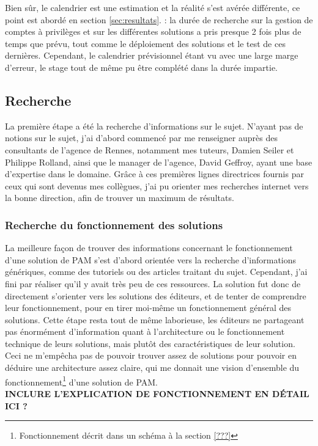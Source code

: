 Bien sûr, le calendrier est une estimation et la réalité s'est avérée différente, ce point est abordé en section \ref{sec:resultats}. : la durée de recherche sur la gestion de comptes à privilèges et sur les différentes solutions a pris presque 2 fois plus de temps que prévu, tout comme le déploiement des solutions et le test de ces dernières. Cependant, le calendrier prévisionnel étant vu avec une large marge d'erreur, le stage tout de même pu être complété dans la durée impartie.

\subsection{Recherche}
\label{subsec:recherche}

La première étape a été la recherche d'informations sur le sujet. N'ayant pas de notions sur le sujet, j'ai d'abord commencé par me renseigner auprès des consultants de l'agence de Rennes, notamment mes tuteurs, Damien Seiler et Philippe Rolland, ainsi que le manager de l'agence, David Geffroy, ayant une base d'expertise dans le domaine. Grâce à ces premières lignes directrices fournis par ceux qui sont devenus mes collègues, j'ai pu orienter mes recherches internet vers la bonne direction, afin de trouver un maximum de résultats.

\subsubsection{Recherche du fonctionnement des solutions}
\label{par:fct_sol}
La meilleure façon de trouver des informations concernant le fonctionnement d'une solution de PAM s'est d'abord orientée vers la recherche d'informations génériques, comme des tutoriels ou des articles traitant du sujet. Cependant, j'ai fini par réaliser qu'il y avait très peu de ces ressources. La solution fut donc de directement s'orienter vers les solutions des éditeurs, et de tenter de comprendre leur fonctionnement, pour en tirer moi-même un fonctionnement général des solutions. Cette étape resta tout de même laborieuse, les éditeurs ne partageant pas énormément d'information quant à l'architecture ou le fonctionnement technique de leurs solutions, mais plutôt des caractéristiques de leur solution. Ceci ne m'empêcha pas de pouvoir trouver assez de solutions pour pouvoir en déduire une architecture assez claire, qui me donnait une vision d'ensemble du fonctionnement\footnote{Fonctionnement décrit dans un schéma à la section \ref{???}} d'une solution de PAM.\\
\textbf{INCLURE L'EXPLICATION DE FONCTIONNEMENT EN DÉTAIL ICI ?}

